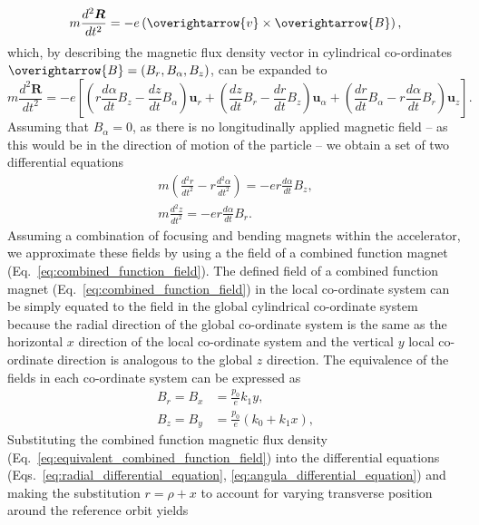 \documentclass[../main.tex]{subfiles}
\begin{document}
\begin{equation}
m\frac{d^{2}\boldsymbol{R}}{dt^{2}}=-e\left(\overightarrow{v}\times\overightarrow{B}\right),
\label{eq:Lorentz_particle_equating_forces}
\end{equation}
which, by describing the magnetic flux density vector in cylindrical co-ordinates $\overightarrow{B} = \left(B_{r},B_{\alpha},B_{z}\right)$, can be expanded to
\begin{equation}
m\frac{d^{2}\boldsymbol{R}}{dt^{2}} = -e\left[\left(r\frac{d\alpha}{dt}B_{z}-\frac{dz}{dt}B_{\alpha}\right)\boldsymbol{u}_{r}+\left(\frac{dz}{dt}B_{r}-\frac{dr}{dt}B_{z}\right)\boldsymbol{u}_{\alpha}+\left(\frac{dr}{dt}B_{\alpha}-r\frac{d\alpha}{dt}B_{r}\right)\boldsymbol{u}_{z}\right].
\label{eq:Lorentz_particle_equating_forces_expanded}    
\end{equation}
Assuming that $B_{\alpha}=0$, as there is no longitudinally applied magnetic field -- as this would be in the direction of motion of the particle -- we obtain a set of two differential equations
\begin{align}
m\left(\frac{d^{2}r}{dt^{2}}-r\frac{d^{2}\alpha}{dt^{2}}\right)=-er\frac{d\alpha}{dt}B_{z},
\label{eq:radial_differential_equation} \\
m\frac{d^{2}z}{dt^{2}}=-er\frac{d\alpha}{dt}B_{r}.
\label{eq:angular_differential_equation}
\end{align}
Assuming a combination of focusing and bending magnets within the accelerator, we approximate these fields by using a the field of a combined function magnet (Eq.~\ref{eq:combined_function_field}). The defined field of a combined function magnet (Eq.~\ref{eq:combined_function_field}) in the local co-ordinate system can be simply equated to the field in the global cylindrical co-ordinate system  because the radial direction of the global co-ordinate system is the same as the horizontal $x$ direction of the local co-ordinate system and the vertical $y$ local co-ordinate direction is analogous to the global $z$ direction. The equivalence of the fields in each co-ordinate system can be expressed as
\begin{align}
B_{r} = B_{x} &= \frac{p_{0}}{e}k_{1}y, \\
B_{z} = B_{y} &= \frac{p_{0}}{e}\left(k_{0}+k_{1}x\right),
\label{eq:equivalent_combined_function_field}
\end{align}
Substituting the combined function magnetic flux density (Eq.~\ref{eq:equivalent_combined_function_field}) into the differential equations (Eqs.~\ref{eq:radial_differential_equation}, \ref{eq:angula_differential_equation}) and making the substitution $r=\rho+x$ to account for varying transverse position around the reference orbit yields
\end{document}
